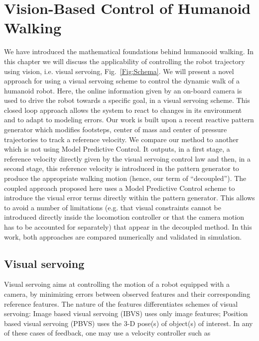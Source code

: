 \chapter{Vision-Based Control of Humanoid Walking} 
\label{Chap:Visual-Servoing}

We have introduced the mathematical foundations behind humanooid walking. In this chapter we will discuss the applicability of controlling the robot trajectory using vision, i.e. visual servoing, Fig.~\ref{Fig:Schema}. We will present a novel approach for using a visual servoing scheme to control the dynamic walk of a humanoid robot. Here, the online information given by an on-board camera is used to drive the robot towards a specific goal, in a visual servoing scheme. This closed loop approach allows the system to react to changes in its environment and to adapt to modeling errors. Our work is built upon a recent reactive pattern generator which modifies footsteps, center of mass and center of pressure trajectories to track a reference velocity. We compare our method to another which is not using Model Predictive Control. It outputs, in a first stage, a reference velocity directly given by the visual servoing control law and then, in a second stage, this reference velocity is introduced in the pattern generator to produce the appropriate walking motion (hence, our term of ``decoupled''). The coupled approach proposed here uses a Model Predictive Control scheme to introduce the visual error terms directly within the pattern generator. This allows to avoid a number of limitations (e.g. that visual constraints cannot be introduced directly inside the locomotion controller or that the camera motion has to be accounted for separately) that appear in the decoupled method.  In this work, both approaches are compared numerically and validated in simulation.

\section{ Visual servoing}

Visual servoing aims at controlling the motion of a robot equipped with a camera, by minimizing errors between observed features and their corresponding reference features. The nature of the features differentiates schemes of visual servoing: Image based visual servoing (IBVS) uses only image features; Position based visual servoing (PBVS) uses the 3-D pose(s) of object(s) of interest. In any of these cases of feedback, one may use a velocity controller such as

